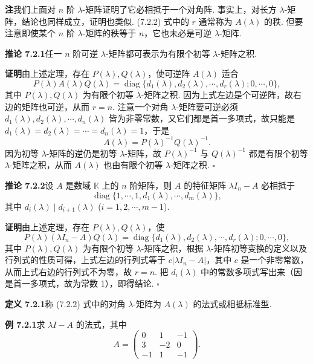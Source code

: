 \documentclass[UTF8, 12pt, fontset=fandol, oneside]{ctexart}
\begin{document}
\noindent\textbf{注}\quad 我们上面对 $n$ 阶 $\lambda$-矩阵证明了它必相抵于一个对角阵. 事实上，对长方 $\lambda$-矩阵，结论也同样成立，证明也类似. (7.2.2) 式中的 $r$ 通常称为 $A(\lambda)$ 的秩. 但要注意即使某个 $n$ 阶 $\lambda$-矩阵的秩等于 $n$，它也未必是可逆 $\lambda$-矩阵.

\noindent\textbf{推论 7.2.1}\quad 任一 $n$ 阶可逆 $\lambda$-矩阵都可表示为有限个初等 $\lambda$-矩阵之积.

\noindent\textbf{证明}\quad 由上述定理，存在 $P(\lambda),Q(\lambda)$，使可逆阵 $A(\lambda)$ 适合
\[
P(\lambda)A(\lambda)Q(\lambda)=\operatorname{diag}\{d_1(\lambda),d_2(\lambda),\cdots,d_r(\lambda);0,\cdots,0\},
\]
其中 $P(\lambda),Q(\lambda)$ 为有限个初等 $\lambda$-矩阵之积. 因为上式左边是个可逆阵，故右边的矩阵也可逆，从而 $r=n$. 注意一个对角 $\lambda$-矩阵要可逆必须 $d_1(\lambda),d_2(\lambda),\cdots,d_n(\lambda)$ 皆为非零常数，又它们都是首一多项式，故只能是 $d_1(\lambda)=d_2(\lambda)=\cdots=d_n(\lambda)=1$，于是
\[
A(\lambda)=P(\lambda)^{-1}Q(\lambda)^{-1}.
\]
因为初等 $\lambda$-矩阵的逆仍是初等 $\lambda$-矩阵，故 $P(\lambda)^{-1}$ 与 $Q(\lambda)^{-1}$ 都是有限个初等 $\lambda$-矩阵之积，从而 $A(\lambda)$ 也由有限个初等 $\lambda$-矩阵之积. $\square$

\noindent\textbf{推论 7.2.2}\quad 设 $A$ 是数域 $\mathbb{K}$ 上的 $n$ 阶矩阵，则 $A$ 的特征矩阵 $\lambda I_n-A$ 必相抵于
\begin{equation}
\operatorname{diag}\{1,\cdots,1,d_1(\lambda),\cdots,d_m(\lambda)\},
\tag{7.2.3}
\end{equation}
其中 $d_i(\lambda)\mid d_{i+1}(\lambda)$ ($i=1,2,\cdots,m-1$).

\noindent\textbf{证明}\quad 由上述定理，存在 $P(\lambda),Q(\lambda)$，使
\[
P(\lambda)(\lambda I_n-A)Q(\lambda)=\operatorname{diag}\{d_1(\lambda),d_2(\lambda),\cdots,d_r(\lambda);0,\cdots,0\},
\]
其中 $P(\lambda),Q(\lambda)$ 为有限个初等 $\lambda$-矩阵之积，根据 $\lambda$-矩阵初等变换的定义以及行列式的性质可得，上式左边的行列式等于 $c|\lambda I_n-A|$，其中 $c$ 是一个非零常数，从而上式右边的行列式不为零，故 $r=n$. 把 $d_i(\lambda)$ 中的常数多项式写出来（因是首一多项式，故为常数 1），即得结论. $\square$

\noindent\textbf{定义 7.2.1}\quad 称 (7.2.2) 式中的对角 $\lambda$-矩阵为 $A(\lambda)$ 的法式或相抵标准型.

\noindent\textbf{例 7.2.1}\quad 求 $\lambda I-A$ 的法式，其中
\[
A=\left(\begin{array}{ccc}
0 & 1 & -1\\
3 & -2 & 0\\
-1 & 1 & -1
\end{array}\right).
\]
\end{document}
